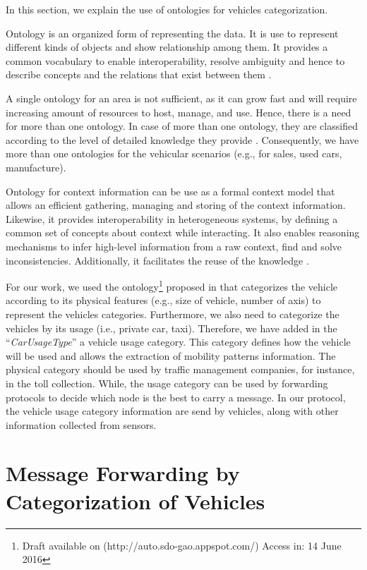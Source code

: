 \documentclass[letterpaper, 10 pt, conference]{ieeeconf}  %
\begin{document}
In this section, we explain the use of ontologies for vehicles categorization.

Ontology is an organized form of representing the data. It is use to represent different kinds of objects and show relationship among them. It provides a common vocabulary to enable interoperability, resolve ambiguity and hence to describe concepts and the relations that exist between them \cite{madkour2011}.

A single ontology for an area is not sufficient, as it can grow fast and will require increasing amount of resources to host, manage, and use. Hence, there is a need for more than one ontology. In case of more than one ontology, they are classified according to the level of detailed knowledge they provide \cite{packer2010}. Consequently, we have more than one ontologies for the vehicular scenarios (e.g., for sales, used cars, manufacture).

Ontology for context information can be use as a formal context model that allows an efficient gathering, managing and storing of the context information. Likewise, it provides interoperability in heterogeneous systems, by defining a common set of concepts about context while interacting. It also enables reasoning mechanisms to infer high-level information from a raw context, find and solve inconsistencies. Additionally, it facilitates the reuse of the knowledge \cite{serrano2007}.

For our work, we used the ontology\footnote{Draft available on (http://auto.sdo-gao.appspot.com/) Access in: 14 June 2016} proposed in \cite{gao_2016} that categorizes the vehicle according to its physical features (e.g., size of vehicle, number of axis) to represent the vehicles categories. Furthermore, we also need to categorize the vehicles by its usage (i.e., private car, taxi). Therefore, we have added in the ``\emph{CarUsageType}'' a vehicle usage category. This category defines how the vehicle will be used and allows the extraction of mobility patterns information. The physical category should be used by traffic management companies, for instance, in the toll collection. While, the usage category can be used by forwarding protocols to decide which node is the best to carry a message. In our protocol, the vehicle usage category information are send by vehicles, along with other information collected from sensors.

\section{Message Forwarding by Categorization of Vehicles}
\end{document}
